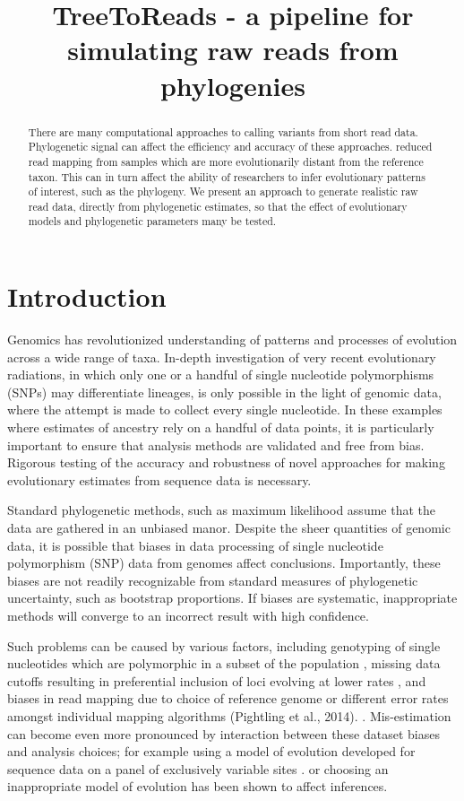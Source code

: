 \documentclass[a4paper,10pt]{article}
\title{TreeToReads - a pipeline for simulating raw reads from phylogenies}
\author{}
\begin{document}
\maketitle

\begin{abstract}
There are many computational approaches to calling variants from short read data.
Phylogenetic signal can affect the efficiency and accuracy of these approaches.
reduced read mapping from samples which are more evolutionarily distant from the reference taxon.
This can in turn affect the ability of researchers to infer evolutionary patterns of interest, such as the phylogeny.
We present an approach to generate realistic raw read data, directly from phylogenetic estimates, 
so that the effect of evolutionary models and phylogenetic parameters many be tested.

\end{abstract}

\section{Introduction}
Genomics has revolutionized understanding of patterns and processes of evolution across a wide range of taxa.
In-depth investigation of very recent evolutionary radiations, in which only one or a handful of single nucleotide polymorphisms (SNPs) may differentiate lineages, 
is only possible in the light of genomic data, where the attempt is made to collect every single nucleotide.
In these examples where estimates of ancestry rely on a handful of data points, it is particularly important to ensure that analysis methods are validated and free from bias. 
Rigorous testing of the accuracy and robustness of novel approaches for making evolutionary estimates
from sequence data is necessary.

Standard phylogenetic methods, such as maximum likelihood assume that the data are gathered in an unbiased manor.
Despite the sheer quantities of genomic data, it is possible that biases in data processing of single nucleotide polymorphism (SNP) data from genomes
affect conclusions.
Importantly, these biases are not readily recognizable from standard measures of phylogenetic uncertainty, 
such as bootstrap proportions.
If biases are systematic, inappropriate methods will converge to an incorrect result with high confidence.

Such problems can be caused by various factors, 
including genotyping of single nucleotides which are polymorphic in a subset of the population \citep{mctavish_how_2015},
missing data cutoffs resulting in preferential inclusion of loci evolving at lower rates \citep{huang_unforeseen_2014},
and biases in read mapping due to choice of reference genome \citep{bertels_automated_2014} or different error rates amongst 
individual mapping algorithms (Pightling et al., 2014). .
Mis-estimation can become even more pronounced by interaction between these dataset biases and analysis choices;
for example using a model of evolution developed for sequence data 
on a panel of exclusively variable sites \citep{lewis_likelihood_2001}.
or choosing an inappropriate model of evolution \citep{sullivan_are_1997} has been shown to affect inferences.
\end{document}
